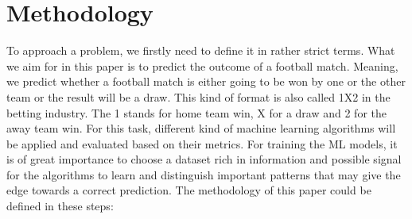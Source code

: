 \documentclass{article}
\begin{document}
\section{Methodology}
To approach a problem, we firstly need to define it in rather strict terms. What we aim for in this paper is to predict the outcome of a football match. Meaning, we predict whether a football match is either going to be won by one or the other team or the result will be a draw. This kind of format is also called 1X2 in the betting industry. The 1 stands for home team win, X for a draw and 2 for the away team win. For this task, different kind of machine learning algorithms will be applied and evaluated based on their metrics. For training the ML models, it is of great importance to choose a dataset rich in information and possible signal for the algorithms to learn and distinguish important patterns that may give the edge towards a correct prediction. The methodology of this paper could be defined in these steps:
\end{document}
